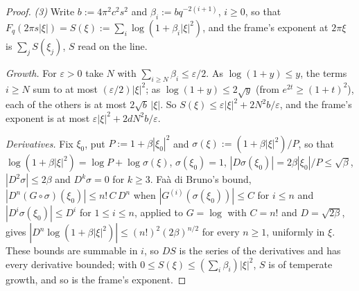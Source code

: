 \begin{proof}
\emph{(3)} Write $b := 4\pi^2c^2s^2$ and $\beta_i := bq^{-2(i+1)}$, $i \ge 0$, so that
$F_q(2\pi s|\xi|) = S(\xi) := \sum_i\log(1 + \beta_i|\xi|^2)$, and the frame's exponent at
$2\pi\xi$ is $\sum_jS(\xi_j)$, $S$ read on the line.

\emph{Growth.} For $\varepsilon > 0$ take $N$
with $\sum_{i \ge N}\beta_i \le \varepsilon/2$. As $\log(1 + y) \le y$, the terms $i \ge N$ sum to
at most $(\varepsilon/2)|\xi|^2$; as $\log(1 + y) \le 2\sqrt y$ (from $e^{2t} \ge (1 + t)^2$), each
of the others is at most $2\sqrt b\,|\xi|$. So $S(\xi) \le \varepsilon|\xi|^2 + 2N^2b/\varepsilon$,
and the frame's exponent is at most $\varepsilon|\xi|^2 + 2dN^2b/\varepsilon$.

\emph{Derivatives.}
Fix $\xi_0$, put $P := 1 + \beta|\xi_0|^2$ and $\sigma(\xi) := (1 + \beta|\xi|^2)/P$, so that
$\log(1 + \beta|\xi|^2) = \log P + \log\sigma(\xi)$, $\sigma(\xi_0) = 1$, $|D\sigma(\xi_0)| =
2\beta|\xi_0|/P \le \sqrt\beta$, $|D^2\sigma| \le 2\beta$ and $D^k\sigma = 0$ for $k \ge 3$. Faà di
Bruno's bound, $|D^n(G \circ \sigma)(\xi_0)| \le n!\,C\,D^n$ when $|G^{(i)}(\sigma(\xi_0))| \le C$
for $i \le n$ and $|D^i\sigma(\xi_0)| \le D^i$ for $1 \le i \le n$, applied to $G = \log$ with $C = n!$ and
$D = \sqrt{2\beta}$, gives $|D^n\log(1 + \beta|\xi|^2)| \le (n!)^2(2\beta)^{n/2}$ for every
$n \ge 1$, uniformly in $\xi$. These bounds are summable in $i$, so $DS$ is the series of the
derivatives and has every derivative bounded; with $0 \le S(\xi) \le (\sum_i\beta_i)|\xi|^2$, $S$ is
of temperate growth, and so is the frame's exponent.


\end{proof}
